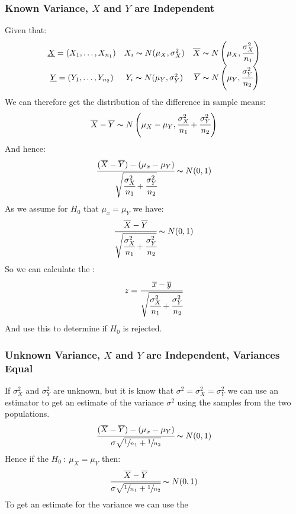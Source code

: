 \documentclass{report}
\begin{document}
\subsubsection*{Known Variance, $X$ and $Y$ are Independent}
Given that:
\[\begin{matrix}
		\underline{X} = (X_1, \dots, X_{n_1}) & X_i \thicksim N(\mu_X, \sigma^2_X) & \overline{X} \thicksim N\left(\mu_X, \cfrac{\sigma^2_X}{n_1}\right) \\
		\underline{Y} = (Y_1, \dots, Y_{n_2}) & Y_i \thicksim N(\mu_Y, \sigma^2_Y) & \overline{Y} \thicksim N\left(\mu_Y, \cfrac{\sigma^2_Y}{n_2}\right) \\
	\end{matrix}\]
We can therefore get the distribution of the difference in sample means:
\[\overline{X} - \overline{Y} \thicksim N\left(\mu_X - \mu_Y, \cfrac{\sigma_X^2}{n_1} + \cfrac{\sigma_Y^2}{n_2}\right)\]
And hence:
\[\cfrac{(\overline{X} - \overline{Y}) - (\mu_x - \mu_Y)}{\sqrt{\cfrac{\sigma^2_X}{n_1} + \cfrac{\sigma^2_Y}{n_2}}} \thicksim N(0, 1)\]
As we assume for $H_0$ that $\mu_x = \mu_Y$ we have:
\[\cfrac{\overline{X} - \overline{Y}}{\sqrt{\cfrac{\sigma^2_X}{n_1} + \cfrac{\sigma^2_Y}{n_2}}} \thicksim N(0, 1)\]
So we can calculate the :
\[z = \cfrac{\overline{x} - \overline{y}}{\sqrt{\cfrac{\sigma^2_X}{n_1} + \cfrac{\sigma^2_Y}{n_2}}}\]
And use this to determine if $H_0$ is rejected.
\subsubsection*{Unknown Variance, $X$ and $Y$ are Independent, Variances Equal}
If $\sigma^2_X$ and $\sigma^2_Y$ are unknown, but it is know that $\sigma^2 = \sigma^2_X = \sigma^2_Y$ we can use an estimator to get an estimate of the variance $\sigma^2$ using the samples from the two populations.
\[\cfrac{(\overline{X} - \overline{Y}) - (\mu_x - \mu_Y)}{\sigma \sqrt{\sfrac{1}{n_1} + \sfrac{1}{n_2}}} \thicksim N(0,1)\]
Hence if the $H_0 \ : \ \mu_X = \mu_Y$ then:
\[\cfrac{\overline{X} - \overline{Y}}{\sigma \sqrt{\sfrac{1}{n_1} + \sfrac{1}{n_2}}}\thicksim N(0,1)\]
To get an estimate for the variance we can use the 
\end{document}
